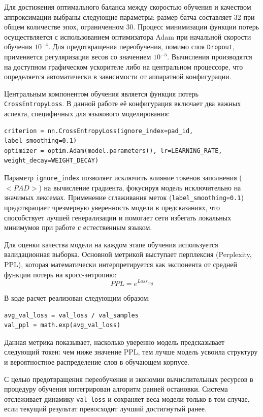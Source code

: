 \documentclass[coursework]{SCWorks}
\begin{document}
    Для достижения оптимального баланса между скоростью обучения и качеством аппроксимации выбраны следующие параметры:
    размер батча составляет 32 при общем количестве эпох, ограниченном 30.
    Процесс минимизации функции потерь осуществляется с использованием оптимизатора Adam
    при начальной скорости обучения $10^{-4}$.
    Для предотвращения переобучения, помимо слоя \texttt{Dropout},
    применяется регуляризация весов со значением $10^{-5}$.
    Вычисления производятся на доступном графическом ускорителе либо на центральном процессоре,
    что определяется автоматически в зависимости от аппаратной конфигурации.

    Центральным компонентом обучения является функция потерь \\ \texttt{CrossEntropyLoss}.
    В данной работе её конфигурация включает два важных аспекта, специфичных для языкового моделирования:

    \begin{verbatim}
criterion = nn.CrossEntropyLoss(ignore_index=pad_id, label_smoothing=0.1)
optimizer = optim.Adam(model.parameters(), lr=LEARNING_RATE, weight_decay=WEIGHT_DECAY)
    \end{verbatim}

    Параметр \texttt{ignore\_index} позволяет исключить влияние токенов заполнения ($<PAD>$) на вычисление градиента, фокусируя модель исключительно на значимых лексемах. Применение сглаживания меток (\texttt{label\_smoothing=0.1}) предотвращает чрезмерную уверенность модели в предсказаниях, что способствует лучшей генерализации и помогает сети избегать локальных минимумов при работе с естественным языком.

    Для оценки качества модели на каждом этапе обучения используется валидационная выборка. Основной метрикой выступает перплексия (Perplexity, PPL), которая математически интерпретируется как экспонента от средней функции потерь на кросс-энтропию:
    \[ PPL = e^{Loss_{avg}} \]

    В коде расчет реализован следующим образом:
    \begin{verbatim}
avg_val_loss = val_loss / val_samples
val_ppl = math.exp(avg_val_loss)
    \end{verbatim}

    Данная метрика показывает, насколько уверенно модель предсказывает следующий токен: чем ниже значение PPL, тем лучше модель усвоила структуру и вероятностное распределение слов в обучающем корпусе.

    С целью предотвращения переобучения и экономии вычислительных ресурсов в процедуру обучения интегрирован алгоритм ранней остановки. Система отслеживает динамику \texttt{val\_loss} и сохраняет веса модели только в том случае, если текущий результат превосходит лучший достигнутый ранее.
\end{document}
